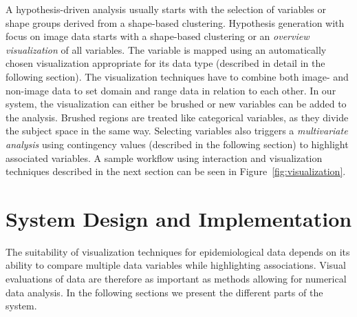 \documentclass[journal]{style/vgtc} 			          %
\newcommand{\rem}[1]{\textcolor{red}{\sout{#1}}}
\begin{document}
%
A hypothesis-driven analysis usually starts with the selection of variables or shape groups derived from a shape-based clustering.
%
Hypothesis generation with focus on image data starts with a shape-based clustering or an \emph{overview visualization} of all variables.
%
The variable is mapped using an automatically chosen visualization appropriate for its data type (described in detail in the following section).
%
The visualization techniques have to combine both image- and non-image data to set domain and range data in relation to each other.
%
In our system, the visualization can either be brushed or new variables can be added to the analysis. 
%
%
Brushed regions are treated like categorical variables, as they divide the subject space in the same way.
%
Selecting variables also triggers a \emph{multivariate analysis} using contingency values (described in the following section) to highlight associated variables.  %
%
A sample workflow using interaction and visualization techniques described in the next section can be seen in Figure~\ref{fig:visualization}.

\section{System Design and Implementation} \label{Interaction- and Visualization Techniques}
%
The suitability of visualization techniques for epidemiological data depends on its ability to compare multiple data variables while highlighting associations.
%
%
Visual evaluations of data are therefore as important as methods allowing for numerical data analysis.
%
In the following sections we present the different parts of the system.
\end{document}

